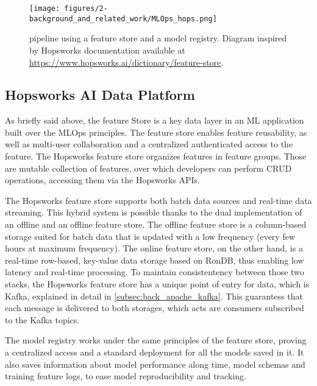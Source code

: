 \begin{figure}[!ht]
    \begin{center}
      \texttt{[image: figures/2-background\_and\_related\_work/MLOps\_hops.png]}
    \end{center}
    \caption[Feature store in an MLOps pipeline]{ pipeline using a feature store and a model registry. Diagram inspired by Hopsworks documentation available at \url{https://www.hopsworks.ai/dictionary/feature-store}.}
    \label{fig:mlops_hops}
\end{figure}


\subsection{Hopsworks AI Data Platform}
\label{subsec:back_hopsworks_FS}
As briefly said above, the feature Store is a key data layer in an \gls{ML} application built over the \gls{MLOps} principles. The feature store enables feature reusability, as well as multi-user collaboration and a centralized authenticated access to the feature. The Hopsworks feature store organizes features in feature groups. Those are mutable collection of features, over which developers can perform \gls{CRUD} operations, accessing them via the Hopsworks \glspl{API}.

The Hopsworks feature store supports both batch data sources and real-time data streaming. This hybrid system is possible thanks to the dual implementation of an offline and an offline feature store. The offline feature store is a column-based storage suited for batch data that is updated with a low frequency (every few hours at maximum frequency). The online feature store, on the other hand, is a real-time row-based, key-value data storage based on RonDB, thus enabling low latency and real-time processing. To maintain consistentency between those two stacks, the Hopsworks feature store has a unique point of entry for data, which is Kafka, explained in detail in \ref{subsec:back_apache_kafka}. This guarantess that each message is delivered to both storages, which acts are consumers subscribed to the Kafka topics.

The model registry works under the same principles of the feature store, proving a centralized access and a standard deployment for all the models saved in it. It also saves information about model performance along time, model schemas and training feature logs, to ease model reproducibility and tracking.